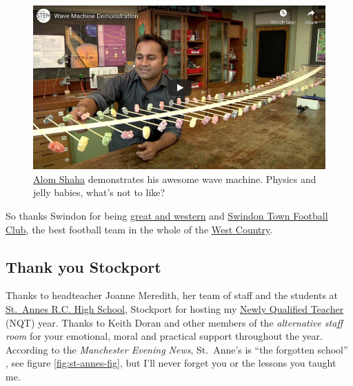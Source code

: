 \documentclass[
]{book}
\begin{document}
\begin{figure}

{\centering \includegraphics[width=0.99\linewidth]{images/youtube-alom} 

}

\caption{\href{https://alomshaha.com/}{Alom Shaha} demonstrates his awesome wave machine. Physics and jelly babies, what's not to like? \citep{youtube-alom}}\label{fig:shaha-fig}
\end{figure}



So thanks Swindon for being \href{https://en.wikipedia.org/wiki/Great_Western_Railway}{great and western} and \href{https://en.wikipedia.org/wiki/Swindon_Town_F.C.}{Swindon Town Football Club}, the best football team in the whole of the \href{https://en.wikipedia.org/wiki/West_Country}{West Country}. 🙏

\hypertarget{stockport}{%
\subsection{Thank you Stockport}\label{stockport}}

Thanks to headteacher Joanne Meredith, her team of staff and the students at \href{https://en.wikipedia.org/wiki/St_Anne\%27s_RC_Voluntary_Academy}{St.~Annes R.C. High School}, Stockport for hosting my \href{https://en.wikipedia.org/wiki/Newly_qualified_teacher}{Newly Qualified Teacher} (NQT) year. Thanks to Keith Doran and other members of the \emph{alternative staff room} for your emotional, moral and practical support throughout the year. According to the \emph{Manchester Evening News}, St.~Anne's is ``the forgotten school'' \citep{stannes1, stannes2}, see figure \ref{fig:st-annes-fig}, but I'll never forget you or the lessons you taught me.
\end{document}
